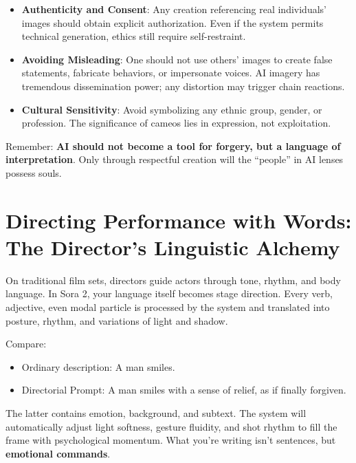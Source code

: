 \begin{itemize}
\item \textbf{Authenticity and Consent}: Any creation referencing real individuals' images should obtain explicit authorization. Even if the system permits technical generation, ethics still require self-restraint.

\item \textbf{Avoiding Misleading}: One should not use others' images to create false statements, fabricate behaviors, or impersonate voices. AI imagery has tremendous dissemination power; any distortion may trigger chain reactions.

\item \textbf{Cultural Sensitivity}: Avoid symbolizing any ethnic group, gender, or profession. The significance of cameos lies in expression, not exploitation.
\end{itemize}

Remember: \textbf{AI should not become a tool for forgery, but a language of interpretation}. Only through respectful creation will the ``people'' in AI lenses possess souls.

\section{Directing Performance with Words: The Director's Linguistic Alchemy}
\label{sec:verbal-direction}

On traditional film sets, directors guide actors through tone, rhythm, and body language. In Sora 2, your language itself becomes stage direction. Every verb, adjective, even modal particle is processed by the system and translated into posture, rhythm, and variations of light and shadow.

Compare:

\begin{itemize}
\item Ordinary description: A man smiles.
\item Directorial Prompt: A man smiles with a sense of relief, as if finally forgiven.
\end{itemize}

The latter contains emotion, background, and subtext. The system will automatically adjust light softness, gesture fluidity, and shot rhythm to fill the frame with psychological momentum. What you're writing isn't sentences, but \textbf{emotional commands}.

